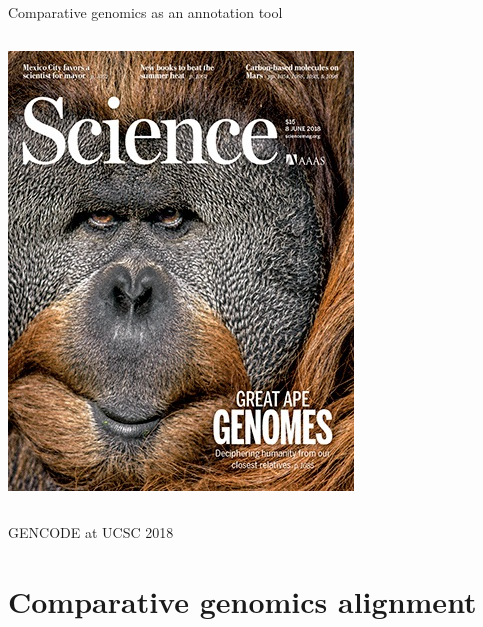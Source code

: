 \documentclass[10pt,
               hyperref={bookmarks=false,
                         bookmarksopen=false,
                         colorlinks=true,
                         linkcolor=blue,
                         urlcolor=blue},
               xcolor={svgnames,table}]{beamer}
\newcommand{\sectionframe}[1]{
  \begin{frame}{\thetitle}
    \section{#1}
  \end{frame}
}
\newcommand{\thetitle}{GENCODE at UCSC 2018}
\begin{document}
\begin{frame}{Comparative genomics as an annotation tool}
\begin{columns}
\begin{column}{0.20\textwidth}
      \vspace{4em}
      \includegraphics[scale=0.2]{images/science-ape.jpg}
    \end{column}
  \end{columns}
\end{frame}

\sectionframe{Comparative genomics alignment}
\end{document}

